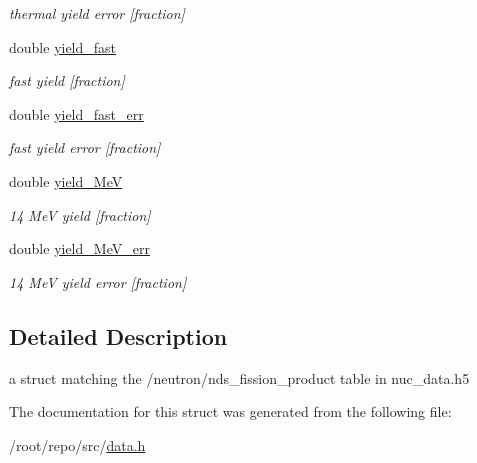 \begin{DoxyCompactItemize}
\begin{DoxyCompactList}\small\item\em thermal yield error \mbox{[}fraction\mbox{]} \end{DoxyCompactList}\item 
\mbox{\label{structpyne_1_1ndsfpy_ae890b10d182d771d0837b24818040a25}} 
double \hyperlink{structpyne_1_1ndsfpy_ae890b10d182d771d0837b24818040a25}{yield\+\_\+fast}
\begin{DoxyCompactList}\small\item\em fast yield \mbox{[}fraction\mbox{]} \end{DoxyCompactList}\item 
\mbox{\label{structpyne_1_1ndsfpy_a0e2478bc6cbf2317861727a88cb8370b}} 
double \hyperlink{structpyne_1_1ndsfpy_a0e2478bc6cbf2317861727a88cb8370b}{yield\+\_\+fast\+\_\+err}
\begin{DoxyCompactList}\small\item\em fast yield error \mbox{[}fraction\mbox{]} \end{DoxyCompactList}\item 
\mbox{\label{structpyne_1_1ndsfpy_a5e67e99b97b5ca511ca39c6dcd4b186e}} 
double \hyperlink{structpyne_1_1ndsfpy_a5e67e99b97b5ca511ca39c6dcd4b186e}{yield\+\_\+MeV}
\begin{DoxyCompactList}\small\item\em 14 MeV yield \mbox{[}fraction\mbox{]} \end{DoxyCompactList}\item 
\mbox{\label{structpyne_1_1ndsfpy_a1d24f4162fe242108b8032f76171d7e5}} 
double \hyperlink{structpyne_1_1ndsfpy_a1d24f4162fe242108b8032f76171d7e5}{yield\+\_\+Me\+V\+\_\+err}
\begin{DoxyCompactList}\small\item\em 14 MeV yield error \mbox{[}fraction\mbox{]} \end{DoxyCompactList}\end{DoxyCompactItemize}


\subsection{Detailed Description}
a struct matching the \textquotesingle{}/neutron/nds\+\_\+fission\+\_\+product\textquotesingle{} table in nuc\+\_\+data.\+h5 

The documentation for this struct was generated from the following file\+:\begin{DoxyCompactItemize}
\item 
/root/repo/src/\hyperlink{data_8h}{data.\+h}\end{DoxyCompactItemize}
